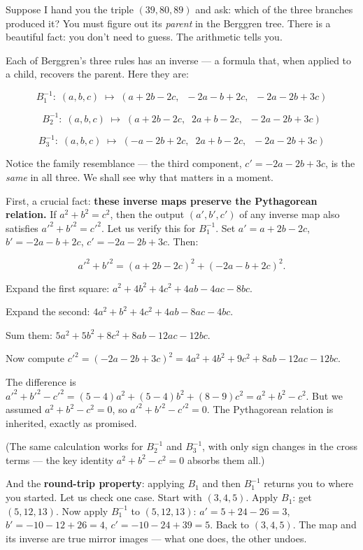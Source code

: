 \documentclass[11pt,twoside,openright]{book}
\theoremstyle{definition}
\theoremstyle{remark}
\begin{document}
Suppose I hand you the triple $(39, 80, 89)$ and ask: which of the three branches produced it? You must figure out its \textit{parent} in the Berggren tree. There is a beautiful fact: you don't need to guess. The arithmetic tells you.

Each of Berggren's three rules has an inverse --- a formula that, when applied to a child, recovers the parent. Here they are:

\[B_1^{-1}:\; (a,b,c) \;\longmapsto\; (a + 2b - 2c,\;\; -2a - b + 2c,\;\; -2a - 2b + 3c)\]

\[B_2^{-1}:\; (a,b,c) \;\longmapsto\; (a + 2b - 2c,\;\; 2a + b - 2c,\;\; -2a - 2b + 3c)\]

\[B_3^{-1}:\; (a,b,c) \;\longmapsto\; (-a - 2b + 2c,\;\; 2a + b - 2c,\;\; -2a - 2b + 3c)\]

Notice the family resemblance --- the third component, $c' = -2a - 2b + 3c$, is the \textit{same} in all three. We shall see why that matters in a moment.

First, a crucial fact: \textbf{these inverse maps preserve the Pythagorean relation.} If $a^2 + b^2 = c^2$, then the output $(a', b', c')$ of any inverse map also satisfies ${a'}^2 + {b'}^2 = {c'}^2$. Let us verify this for $B_1^{-1}$. Set $a' = a + 2b - 2c$, $b' = -2a - b + 2c$, $c' = -2a - 2b + 3c$. Then:

\[{a'}^2 + {b'}^2 = (a + 2b - 2c)^2 + (-2a - b + 2c)^2.\]

Expand the first square: $a^2 + 4b^2 + 4c^2 + 4ab - 4ac - 8bc$.

Expand the second: $4a^2 + b^2 + 4c^2 + 4ab - 8ac - 4bc$.

Sum them: $5a^2 + 5b^2 + 8c^2 + 8ab - 12ac - 12bc$.

Now compute ${c'}^2 = (-2a - 2b + 3c)^2 = 4a^2 + 4b^2 + 9c^2 + 8ab - 12ac - 12bc$.

The difference is ${a'}^2 + {b'}^2 - {c'}^2 = (5-4)a^2 + (5-4)b^2 + (8-9)c^2 = a^2 + b^2 - c^2$. But we assumed $a^2 + b^2 - c^2 = 0$, so ${a'}^2 + {b'}^2 - {c'}^2 = 0$. The Pythagorean relation is inherited, exactly as promised.

(The same calculation works for $B_2^{-1}$ and $B_3^{-1}$, with only sign changes in the cross terms --- the key identity $a^2 + b^2 - c^2 = 0$ absorbs them all.)

And the \textbf{round-trip property}: applying $B_1$ and then $B_1^{-1}$ returns you to where you started. Let us check one case. Start with $(3, 4, 5)$. Apply $B_1$: get $(5, 12, 13)$. Now apply $B_1^{-1}$ to $(5, 12, 13)$: $a' = 5 + 24 - 26 = 3$, $b' = -10 - 12 + 26 = 4$, $c' = -10 - 24 + 39 = 5$. Back to $(3, 4, 5)$. The map and its inverse are true mirror images --- what one does, the other undoes.
\end{document}
